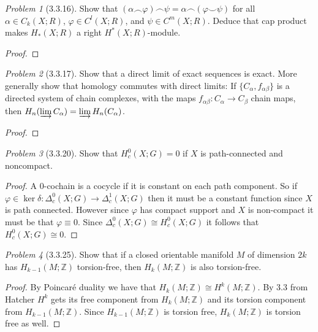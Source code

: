 \documentclass[10pt]{article}
\newcommand{\sk}{\vskip 10mm}
\newcommand{\bb}[1]{\mathbb{#1}}
\theoremstyle{remark}
\newtheorem{problem}{Problem}
\begin{document}
\sk

\begin{problem}[3.3.16]
  Show that
  $(\alpha\smallfrown \varphi)\smallfrown \psi=\alpha\smallfrown (\varphi\smallsmile \psi)$
  for all $\alpha\in C_k(X;R)$, $\varphi\in C^l(X;R)$, and $\psi\in C^m(X;R)$.
  Deduce that cap product makes $H_*(X;R)$ a right $H^*(X;R)$-module.
\end{problem}

\begin{proof}
  
\end{proof}

\sk

\begin{problem}[3.3.17]
  Show that a direct limit of exact sequences is exact. More generally show that
  homology commutes with direct limits: If $\{C_\alpha,f_{\alpha\beta}\}$ is a
  directed system of chain complexes, with the maps
  $f_{\alpha\beta}:C_\alpha\rightarrow C_\beta$ chain maps,
  then $H_n(\varinjlim C_\alpha)=\varinjlim H_n(C_\alpha)$.
\end{problem}

\begin{proof}
  
\end{proof}

\sk

\begin{problem}[3.3.20]
  Show that $H_c^0(X;G)=0$ if $X$ is path-connected and noncompact.
\end{problem}

\begin{proof}
  A $0$-cochain is a cocycle if it is constant on each
  path component. So if $\varphi\in\ker\delta:\Delta_c^0(X;G)\rightarrow\Delta_c^1(X;G)$ then it must be a constant
  function since $X$ is path connected. However since $\varphi$ has compact
  support and $X$ is non-compact it must be that $\varphi\equiv 0$. Since
  $\Delta_c^0(X;G)\cong H_c^0(X;G)$ it follows that $H_c^0(X;G)\cong 0$.
\end{proof}

\sk

\begin{problem}[3.3.25]
  Show that if a closed orientable manifold $M$ of dimension $2k$ has
  $H_{k-1}(M;\bb{Z})$ torsion-free, then $H_k(M;\bb{Z})$ is also torsion-free.
\end{problem}

\begin{proof}
  By Poincar\'e duality we have that $H_k(M;\bb{Z})\cong H^k(M;\bb{Z})$.
  By 3.3 from Hatcher $H^k$ gets its free component from $H_k(M;\bb{Z})$ and
  its torsion component from $H_{k-1}(M;\bb{Z})$. Since $H_{k-1}(M;\bb{Z})$ is
  torsion free, $H_k(M;\bb{Z})$ is torsion free as well.
\end{proof}
\end{document}
